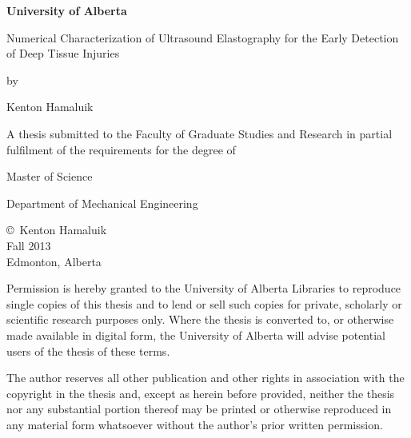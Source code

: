 \begin{center}

{\fontsize{14pt}{1em}\selectfont \textbf{University of Alberta}}
\vspace{3em}

{\fontsize{13pt}{1em}\selectfont Numerical Characterization of Ultrasound Elastography for the Early Detection of Deep Tissue Injuries}
\vspace{2em}

{\fontsize{10pt}{1em} by}
\vspace{1em}

{\fontsize{13pt}{1em} Kenton Hamaluik}
\vspace{5em}

{\fontsize{11pt}{1em} A thesis submitted to the Faculty of Graduate Studies and Research in partial fulfilment of the requirements for the degree of}
\vspace{3em}

{\fontsize{13pt}{1em} Master of Science}
\vspace{4em}

{\fontsize{13pt}{1em} Department of Mechanical Engineering}
\vspace{5em}

{\fontsize{11pt}{1em}\copyright\ Kenton Hamaluik \\
Fall 2013 \\
Edmonton, Alberta}
\vfill

{\fontsize{9pt}{1em} Permission is hereby granted to the University of Alberta Libraries to reproduce single copies of this thesis and to lend or sell such copies for private, scholarly or scientific research purposes only. Where the thesis is converted to, or otherwise made available in digital form, the University of Alberta will advise potential users of the thesis of these terms.
\vspace{1em}

The author reserves all other publication and other rights in association with the copyright in the thesis and, except as herein before provided, neither the thesis nor any substantial portion thereof may be printed or otherwise reproduced in any material form whatsoever without the author's prior written permission.}
\end{center}